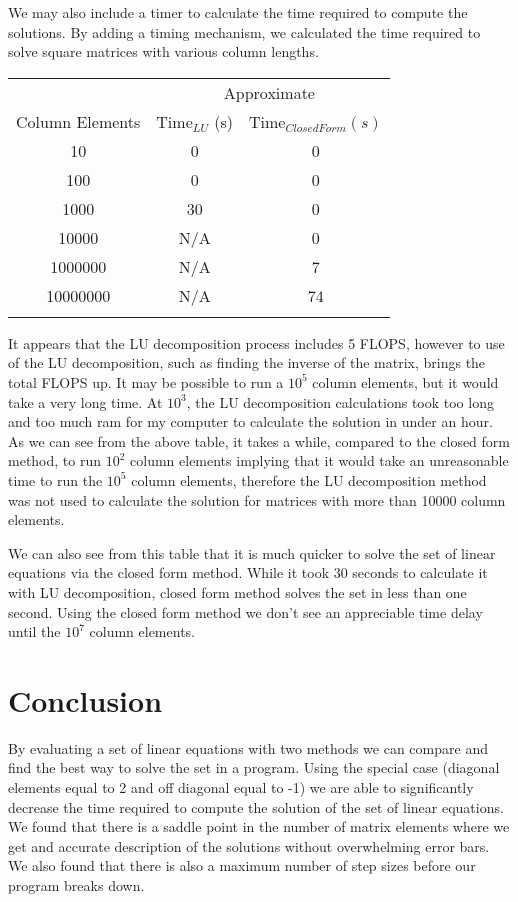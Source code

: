 \documentclass[10pt,showpacs,preprintnumbers,footinbib,amsmath,amssymb,aps,prl,twocolumn,groupedaddress,superscriptaddress,showkeys]{revtex4-1}
\begin{document}
	We may also include a timer to calculate the time required to compute the solutions.  By adding a timing mechanism, we calculated the time required to solve square matrices with various column lengths.
	
	\begin{center}
		\begin{tabular}{ccc}
			\hline \hline
			& \multicolumn{2}{c}{Approximate} \\
			Column Elements & Time$_{LU}$ (s) & Time$_{Closed Form} (s)$\\
			\hline
			10 & 0 & 0\\
			100 & 0 & 0\\
			1000 & 30 & 0\\
			10000 & N/A  & 0\\
			1000000 & N/A  & 7\\
			10000000 & N/A & 74\\
			\hline
			\label{timingtable}
		\end{tabular}
	\end{center}

It appears that the LU decomposition process includes 5 FLOPS, however to use of the LU decomposition, such as finding the inverse of the matrix, brings the total FLOPS up.  It may be possible to run a $10^{5}$ column elements, but it would take a very long time.  At $10^{3}$, the LU decomposition calculations took too long and too much ram for my computer to calculate the solution in under an hour.  As we can see from the above table, it takes a while, compared to the closed form method, to run $10^{2}$ column elements implying that it would take an unreasonable time to run the 
$10^{5}$ column elements, therefore the LU decomposition method was not used to calculate the solution for matrices with more than 10000 column elements.

We can also see from this table that it is much quicker to solve the set of linear equations via the closed form method.  While it took 30 seconds to calculate it with LU decomposition, closed form method solves the set in less than one second.  Using the closed form method we don't see an appreciable time delay until the $10^{7}$ column elements.


	
	\section*{Conclusion}
	
	By evaluating a set of linear equations with two methods we can compare and find the best way to solve the set in a program.  Using the special case (diagonal elements equal to 2 and off diagonal equal to -1) we are able to significantly decrease the time required to compute the solution of the set of linear equations.  We found that there is a saddle point in the number of matrix elements where we get and accurate description of the solutions without overwhelming error bars.  We also found that there is also a maximum number of step sizes before our program breaks down.
	
\end{document}
